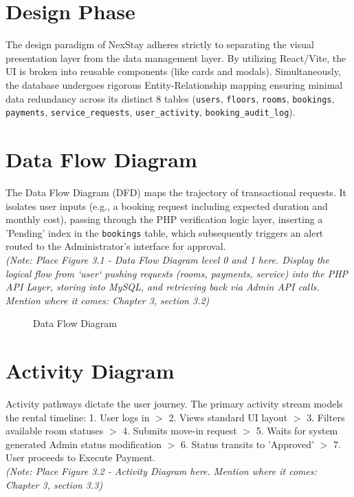 \documentclass[12pt,a4paper]{report}
\begin{document}
\section{Design Phase}
The design paradigm of NexStay adheres strictly to separating the visual presentation layer from the data management layer. By utilizing React/Vite, the UI is broken into reusable components (like cards and modals). Simultaneously, the database undergoes rigorous Entity-Relationship mapping ensuring minimal data redundancy across its distinct 8 tables (\texttt{users}, \texttt{floors}, \texttt{rooms}, \texttt{bookings}, \texttt{payments}, \texttt{service\_requests}, \texttt{user\_activity}, \texttt{booking\_audit\_log}). 

\section{Data Flow Diagram}
The Data Flow Diagram (DFD) maps the trajectory of transactional requests. It isolates user inputs (e.g., a booking request including expected duration and monthly cost), passing through the PHP verification logic layer, inserting a 'Pending' index in the \texttt{bookings} table, which subsequently triggers an alert routed to the Administrator's interface for approval.
\vspace{0.5cm}\\
\textit{(Note: Place Figure 3.1 - Data Flow Diagram level 0 and 1 here. Display the logical flow from `user` pushing requests (rooms, payments, service) into the PHP API Layer, storing into MySQL, and retrieving back via Admin API calls. Mention where it comes: Chapter 3, section 3.2)}

\begin{figure}[H]
    \centering
    \vspace{5cm} %
    \caption{Data Flow Diagram}
    \label{fig:dfd}
\end{figure}

\section{Activity Diagram}
Activity pathways dictate the user journey. The primary activity stream models the rental timeline: 1. User logs in $>$ 2. Views standard UI layout $>$ 3. Filters available room statuses $>$ 4. Submits move-in request $>$ 5. Waits for system generated Admin status modification $>$ 6. Status transits to 'Approved' $>$ 7. User proceeds to Execute Payment.
\vspace{0.5cm}\\
\textit{(Note: Place Figure 3.2 - Activity Diagram here. Mention where it comes: Chapter 3, section 3.3)}
\end{document}
